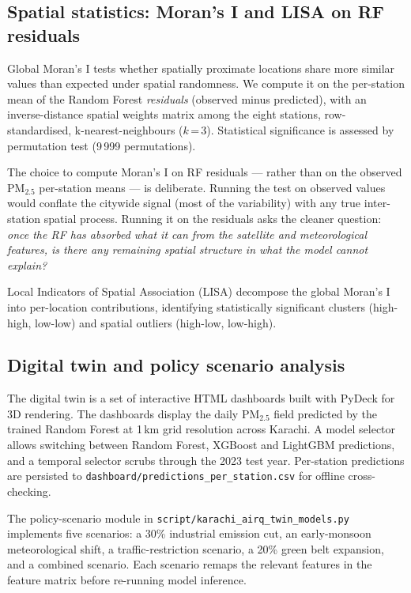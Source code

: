 \documentclass{iopjournal}
\begin{document}
\subsection{Spatial statistics: Moran's I and LISA on RF residuals}

Global Moran's I \cite{Moran1950} tests whether spatially proximate
locations share more similar values than expected under spatial
randomness. We compute it on the per-station mean of the Random
Forest \textit{residuals} (observed minus predicted), with an
inverse-distance spatial weights matrix among the eight stations,
row-standardised, k-nearest-neighbours ($k$\,=\,3). Statistical
significance is assessed by permutation test (9\,999 permutations).

The choice to compute Moran's I on RF residuals --- rather than on
the observed PM$_{2.5}$ per-station means --- is deliberate. Running
the test on observed values would conflate the citywide signal (most
of the variability) with any true inter-station spatial process.
Running it on the residuals asks the cleaner question: \emph{once
the RF has absorbed what it can from the satellite and meteorological
features, is there any remaining spatial structure in what the model
cannot explain?}

Local Indicators of Spatial Association (LISA) \cite{Anselin1995}
decompose the global Moran's I into per-location contributions,
identifying statistically significant clusters (high-high,
low-low) and spatial outliers (high-low, low-high).

\subsection{Digital twin and policy scenario analysis}

The digital twin is a set of interactive HTML dashboards built with
PyDeck for 3D rendering. The dashboards display the daily
PM$_{2.5}$ field predicted by the trained Random Forest at 1\,km
grid resolution across Karachi. A model selector allows switching
between Random Forest, XGBoost and LightGBM predictions, and a
temporal selector scrubs through the 2023 test year. Per-station
predictions are persisted to
\texttt{dashboard/predictions\_per\_station.csv} for offline
cross-checking.

The policy-scenario module in
\texttt{script/karachi\_airq\_twin\_models.py} implements five
scenarios: a 30\% industrial emission cut, an early-monsoon
meteorological shift, a traffic-restriction scenario, a 20\% green
belt expansion, and a combined scenario. Each scenario remaps the
relevant features in the feature matrix before re-running model
inference.
\end{document}
